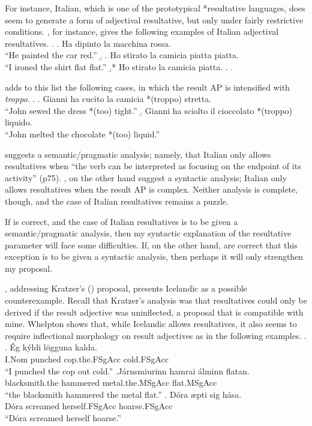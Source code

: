 \documentclass[MilwayThesis]{subfiles}
\begin{document}
For instance, Italian, which is one of the prototypical *resultative languages, does seem to generate a form of adjectival resultative, but only under fairly restrictive conditions.
\textcite{napoli1992secondary}, for instance, gives the following examples of Italian adjectival resultatives.
\ex.
\a. Ha dipinto la macchina rossa.\\
``He painted the car red.''
\b. 
	\a. Ho stirato la camicia piatta piatta.\\
	``I ironed the shirt flat flat.''
	\b.* Ho stirato la camicia piatta.
	\z.
\z.

\textcite{folli2005prepositions} adds to this list the following cases, in which the result AP is intensified with \textit{troppo}.
\ex.
\a. Gianni ha cucito la camicia *(troppo) stretta.\\
``John sewed the dress *(too) tight.''
\b. Gianni ha sciolto il cioccolato *(troppo) liquido.\\
``John melted the chocolate *(too) liquid.''

\textcite{napoli1992secondary} suggests a semantic/pragmatic analysis; namely, that Italian only allows resultatives when ``the verb can be interpreted as focusing on the endpoint of its activity'' (p75).
\textcite{folli2005prepositions}, on the other hand suggest a syntactic analysis; Italian only allows resultatives when the result AP is complex.
Neither analysis is complete, though, and the case of Italian resultatives remains a puzzle.

If \citeauthor{napoli1992secondary} is correct, and the case of Italian resultatives is to be given a semantic/pragmatic analysis, then my syntactic explanation of the resultative parameter will face some difficulties.
If, on the other hand, \citeauthor{folli2005prepositions} are correct that this exception is to be given a syntactic analysis, then perhaps it will only strengthen my proposal.

\textcite{whelpton2007building}, addressing Kratzer's (\citeyear{kratzer2004building}) proposal, presents Icelandic as a possible counterexample. 
Recall that Kratzer's analysis was that resultatives could only be derived if the result adjective was uninflected, a proposal that is compatible with mine.
Whelpton shows that, while Icelandic allows resultatives, it also seems to require inflectional morphology on result adjectives as in the following examples.
\ex.
\ag. \'Eg k\'yldi l\"ogguna kalda.\\
I.Nom punched cop.the.FSgAcc cold.FSgAcc\\
``I punched the cop out cold.''
\bg.J\'{a}rnsmi\dh{}urinn hamra\dh{}i \'{a}lminn flatan.\\
blacksmith.the hammered metal.the.MSgAcc flat.MSgAcc\\
``the blacksmith hammered the metal flat.''
\bg. D\'{o}ra \ae{}pti sig h\'{a}sa.\\
D\'{o}ra screamed herself.FSgAcc hoarse.FSgAcc\\
``D\'{o}ra screamed herself hoarse.''
\end{document}
